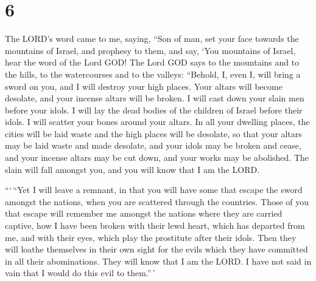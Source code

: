 \hypertarget{section-5}{%
\section{6}\label{section-5}}

 The LORD's word came to me, saying,  ``Son of
man, set your face towards the mountains of Israel, and prophesy to
them,  and say, `You mountains of Israel, hear the word of
the Lord GOD! The Lord GOD says to the mountains and to the hills, to
the watercourses and to the valleys: ``Behold, I, even I, will bring a
sword on you, and I will destroy your high places.  Your
altars will become desolate, and your incense altars will be broken. I
will cast down your slain men before your idols.  I will lay
the dead bodies of the children of Israel before their idols. I will
scatter your bones around your altars.  In all your dwelling
places, the cities will be laid waste and the high places will be
desolate, so that your altars may be laid waste and made desolate, and
your idols may be broken and cease, and your incense altars may be cut
down, and your works may be abolished.  The slain will fall
amongst you, and you will know that I am the LORD.

 ```\,``Yet I will leave a remnant, in that you will have
some that escape the sword amongst the nations, when you are scattered
through the countries.  Those of you that escape will
remember me amongst the nations where they are carried captive, how I
have been broken with their lewd heart, which has departed from me, and
with their eyes, which play the prostitute after their idols. Then they
will loathe themselves in their own sight for the evils which they have
committed in all their abominations.  They will know that I
am the LORD. I have not said in vain that I would do this evil to
them.''\,'

